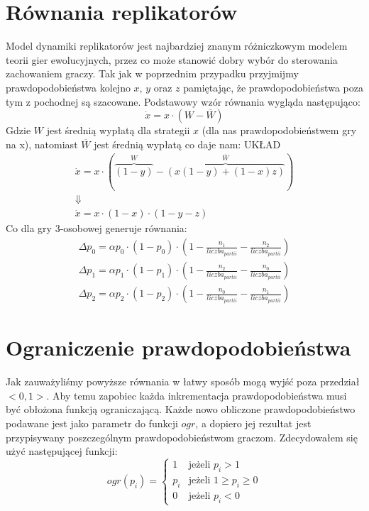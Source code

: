 \section{Równania replikatorów}
\label{sec:r_repli}
Model dynamiki replikatorów jest najbardziej znanym różniczkowym modelem teorii gier ewolucyjnych, przez co może stanowić dobry wybór do sterowania zachowaniem graczy. Tak jak w poprzednim przypadku przyjmijmy prawdopodobieństwa kolejno $x$, $y$ oraz $z$ pamiętając, że prawdopodobieństwa poza tym z pochodnej są szacowane. Podstawowy wzór równania wygląda następująco:
\begin{equation}
\dot{x} = x \cdot ( W - \overline{W})
\end{equation}
Gdzie $W$ jest średnią wypłatą dla strategii $x$ (dla nas prawdopodobieństwem gry na x), natomiast $\overline{W}$ jest średnią wypłatą co daje nam:
{\color{red} UKŁAD}
\begin{align*}
\dot{x} = x \cdot ( \overbrace{(1-y)}^{W} - \overbrace{(x(1-y) + (1-x)z)}^{\overline{W}}) \\
\Downarrow \\
\dot{x} = x \cdot (1-x) \cdot (1-y-z)
\end{align*}
Co dla gry 3-osobowej generuje równania:
\begin{align} \label{eq:repli}
\Delta p_0 = \alpha p_0 \cdot (1 - p_0) \cdot (1 - \frac{n_1}{liczba_{partii}} - \frac{n_2}{liczba_{partii}}) \nonumber \\
\Delta p_1 = \alpha p_1 \cdot (1 - p_1) \cdot (1 - \frac{n_2}{liczba_{partii}} - \frac{n_0}{liczba_{partii}}) \\
\Delta p_2 = \alpha p_2 \cdot (1 - p_2) \cdot (1 - \frac{n_0}{liczba_{partii}} - \frac{n_1}{liczba_{partii}}) \nonumber
\end{align} 


\section{Ograniczenie prawdopodobieństwa}
\label{sec:ograniczenie}
Jak zauważyliśmy powyższe równania w łatwy sposób mogą wyjść poza przedział $<0,1>$. Aby temu zapobiec każda inkrementacja prawdopodobieństwa musi być obłożona funkcją ograniczającą. Każde nowo obliczone prawdopodobieństwo podawane jest jako parametr do funkcji $ogr$, a dopiero jej rezultat jest przypisywany poszczególnym prawdopodobieństwom graczom. Zdecydowałem się użyć następującej funkcji:
\begin{displaymath}
ogr(p_i) = \left\{
\begin{array}{ll}
1 & \text{jeżeli } p_i > 1 \\
p_i & \text{jeżeli } 1 \geq p_i \geq 0 \\
0 & \text{jeżeli } p_i < 0
\end{array} 
\right.
\end{displaymath}

